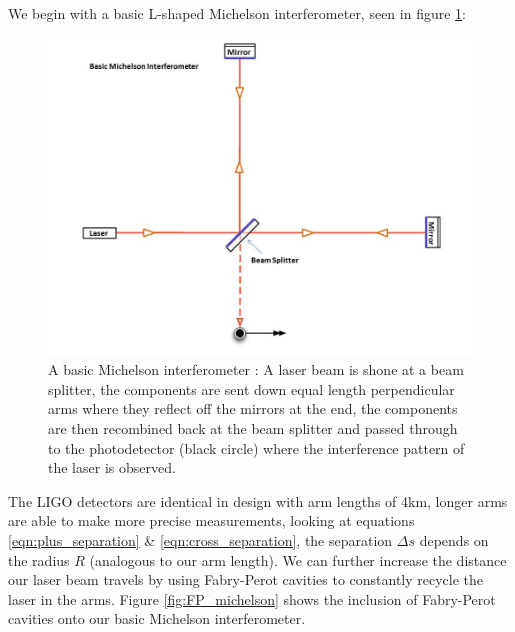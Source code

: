 We begin with a basic L-shaped Michelson interferometer, seen in figure \ref{fig:basic_michelson}:

\begin{figure}
   \includegraphics[width=\textwidth]{images/1_general_relativity/Basic_michelson_labeled.jpg}
   \caption{\label{fig:basic_michelson}A basic Michelson interferometer \cite{ligo_ifo}: A laser beam is shone at a beam splitter, the components are sent down equal length perpendicular arms where they reflect off the mirrors at the end, the components are then recombined back at the beam splitter and passed through to the photodetector (black circle) where the interference pattern of the laser is observed.}
\end{figure}

The LIGO detectors are identical in design with arm lengths of 4km, longer arms are able to make more precise measurements, looking at equations \ref{eqn:plus_separation} \& \ref{eqn:cross_separation}, the separation
$\Delta s$ depends on the radius $R$ (analogous to our arm length). We can further increase the distance our laser beam travels by using Fabry-Perot cavities to constantly recycle the laser in the arms. Figure \ref{fig:FP_michelson} shows the inclusion of Fabry-Perot cavities onto our basic Michelson interferometer.


